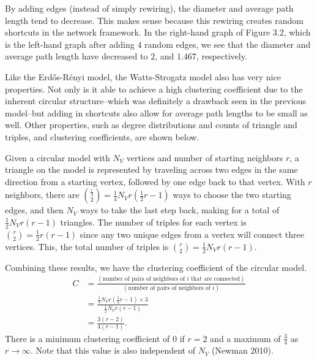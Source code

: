 \documentclass[12pt,twoside]{amherstthesis}
\begin{document}
  By adding edges (instead of simply rewiring), the diameter and average
  path length tend to decrease. This makes sense because this rewiring
  creates random shortcuts in the network framework. In the right-hand
  graph of Figure 3.2, which is the left-hand graph after adding \(4\)
  random edges, we see that the diameter and average path length have
  decreased to \(2\), and \(1.467\), respectively.
  
  Like the Erdős-Rényi model, the Watts-Strogatz model also has very nice
  properties. Not only is it able to achieve a high clustering coefficient
  due to the inherent circular structure--which was definitely a drawback
  seen in the previous model--but adding in shortcuts also allow for
  average path lengths to be small as well. Other properties, such as
  degree distributions and counts of triangle and triples, and clustering
  coefficients, are shown below.
  
  Given a circular model with \(N_{V}\) vertices and number of starting
  neighbors \(r\), a triangle on the model is represented by traveling
  across two edges in the same direction from a starting vertex, followed
  by one edge back to that vertex. With \(r\) neighbors, there are
  \({\frac {r} {2} \choose 2} = \frac {1} {4} N_{V} r \left(\frac {1} {2} r - 1 \right)\)
  ways to choose the two starting edges, and then \(N_V\) ways to take the
  last step back, making for a total of \(\frac {1} {2} N_{V} r(r - 1)\)
  triangles. The number of triples for each vertex is
  \({r \choose 2} = \frac {1} {2}r(r - 1)\) since any two unique edges
  from a vertex will connect three vertices. This, the total number of
  triples is \({r \choose 2} = \frac {1} {2}N_{V}r(r - 1)\).
  
  Combining these results, we have the clustering coefficient of the
  circular model. \[
  \begin{aligned}
  C &= \frac {(\text{number of pairs of neighbors of } i \text{ that are connected})} {(\text{number of pairs of neighbors of } i)} \\
  &= \frac {\frac {1} {4} N_{V} r \left(\frac {1} {2} r - 1 \right) \times 3} {\frac {1} {2} N_{V} r(r - 1)} \\
  &= \frac {3(r - 2)} {4(r - 1)}.
  \end{aligned}
  \] There is a minimum clustering coefficient of \(0\) if \(r = 2\) and a
  maximum of \(\frac {3} {4}\) as \(r \to \infty\). Note that this value
  is also independent of \(N_{V}\) (Newman 2010).
  
\end{document}
